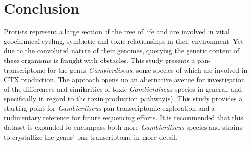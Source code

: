 \documentclass[12pt]{article}
\begin{document}
\section*{Conclusion}
Protists represent a large section of the tree of life and are involved in vital geochemical cycling, symbiotic and toxic relationships in their environment. 
Yet due to the convoluted nature of their genomes, querying the genetic content of these organisms is fraught with obstacles. 
This study presents a pan-transcriptome for the genus \textit{Gambierdiscus}, some species of which are involved in CTX production. 
The approach opens up an alternative avenue for investigation of the differences and similarities of toxic \textit{Gambierdiscus} species in general, and specifically in regard to the toxin production pathway(s). 
This study provides a starting point for \textit{Gambierdiscus} pan-transcriptomic exploration and a rudimentary reference for future sequencing efforts.
It is recommended that this dataset is expanded to encompass both more \textit{Gambierdiscus} species and strains to crystallize the genus' pan-transcriptome in more detail.


\clearpage%

\newpage


\end{document}
